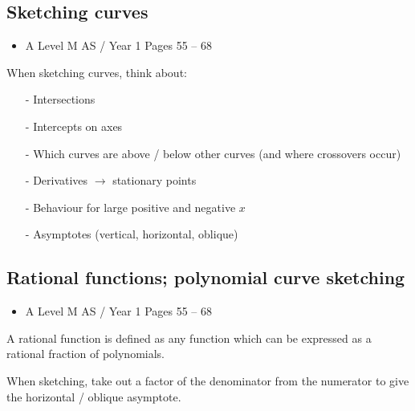 \documentclass[11pt, a4paper]{article}
\begin{document}
\subsection{Sketching curves}
\begin{itemize}
\item A Level M AS / Year 1 \hspace{1cm} \phantom{ } Pages 55 -- 68
\end{itemize} \par
When sketching curves, think about:
\begin{itemize}
\item[-] Intersections
\vspace{-0.25cm}
\item[-] Intercepts on axes
\vspace{-0.25cm}
\item[-] Which curves are above / below other curves (and where crossovers occur)
\vspace{-0.25cm}
\item[-] Derivatives $\rightarrow$ stationary points
\vspace{-0.25cm}
\item[-] Behaviour for large positive and negative $x$
\vspace{-0.25cm}
\item[-] Asymptotes (vertical, horizontal, oblique)
\end{itemize}
\vspace{0.5cm}


\subsection{Rational functions; polynomial curve sketching}
\begin{itemize}
\item A Level M AS / Year 1 \hspace{1cm} \phantom{ } Pages 55 -- 68
\end{itemize} \par
A rational function is defined as any function which can be expressed as a rational fraction of polynomials. \newline \par

When sketching, take out a factor of the denominator from the numerator to give the horizontal / oblique asymptote. \newline \par
\end{document}

